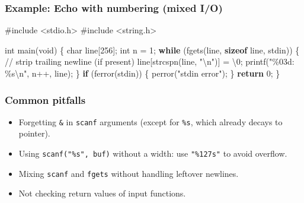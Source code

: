 \documentclass[
  letterpaper,
  DIV=11,
  numbers=noendperiod]{scrreprt}
\newenvironment{Shaded}{\begin{snugshade}}{\end{snugshade}}
\newcommand{\CharTok}[1]{\textcolor[rgb]{0.13,0.47,0.30}{#1}}
\newcommand{\CommentTok}[1]{\textcolor[rgb]{0.37,0.37,0.37}{#1}}
\newcommand{\ControlFlowTok}[1]{\textcolor[rgb]{0.00,0.23,0.31}{\textbf{#1}}}
\newcommand{\DataTypeTok}[1]{\textcolor[rgb]{0.68,0.00,0.00}{#1}}
\newcommand{\DecValTok}[1]{\textcolor[rgb]{0.68,0.00,0.00}{#1}}
\newcommand{\ImportTok}[1]{\textcolor[rgb]{0.00,0.46,0.62}{#1}}
\newcommand{\KeywordTok}[1]{\textcolor[rgb]{0.00,0.23,0.31}{\textbf{#1}}}
\newcommand{\NormalTok}[1]{\textcolor[rgb]{0.00,0.23,0.31}{#1}}
\newcommand{\OperatorTok}[1]{\textcolor[rgb]{0.37,0.37,0.37}{#1}}
\newcommand{\PreprocessorTok}[1]{\textcolor[rgb]{0.68,0.00,0.00}{#1}}
\newcommand{\SpecialCharTok}[1]{\textcolor[rgb]{0.37,0.37,0.37}{#1}}
\newcommand{\StringTok}[1]{\textcolor[rgb]{0.13,0.47,0.30}{#1}}
\providecommand{\tightlist}{%
  \setlength{\itemsep}{0pt}\setlength{\parskip}{0pt}}
\begin{document}
\subsubsection{Example: Echo with numbering (mixed
I/O)}\label{example-echo-with-numbering-mixed-io}

\begin{Shaded}
\begin{Highlighting}[]
\PreprocessorTok{\#include }\ImportTok{\textless{}stdio.h\textgreater{}}
\PreprocessorTok{\#include }\ImportTok{\textless{}string.h\textgreater{}}

\DataTypeTok{int}\NormalTok{ main}\OperatorTok{(}\DataTypeTok{void}\OperatorTok{)} \OperatorTok{\{}
    \DataTypeTok{char}\NormalTok{ line}\OperatorTok{[}\DecValTok{256}\OperatorTok{];}
    \DataTypeTok{int}\NormalTok{ n }\OperatorTok{=} \DecValTok{1}\OperatorTok{;}
    \ControlFlowTok{while} \OperatorTok{(}\NormalTok{fgets}\OperatorTok{(}\NormalTok{line}\OperatorTok{,} \KeywordTok{sizeof}\NormalTok{ line}\OperatorTok{,}\NormalTok{ stdin}\OperatorTok{))} \OperatorTok{\{}
        \CommentTok{// strip trailing newline (if present)}
\NormalTok{        line}\OperatorTok{[}\NormalTok{strcspn}\OperatorTok{(}\NormalTok{line}\OperatorTok{,} \StringTok{"}\SpecialCharTok{\textbackslash{}n}\StringTok{"}\OperatorTok{)]} \OperatorTok{=} \CharTok{\textquotesingle{}}\SpecialCharTok{\textbackslash{}0}\CharTok{\textquotesingle{}}\OperatorTok{;}
\NormalTok{        printf}\OperatorTok{(}\StringTok{"}\SpecialCharTok{\%03d}\StringTok{: }\SpecialCharTok{\%s\textbackslash{}n}\StringTok{"}\OperatorTok{,}\NormalTok{ n}\OperatorTok{++,}\NormalTok{ line}\OperatorTok{);}
    \OperatorTok{\}}
    \ControlFlowTok{if} \OperatorTok{(}\NormalTok{ferror}\OperatorTok{(}\NormalTok{stdin}\OperatorTok{))} \OperatorTok{\{}\NormalTok{ perror}\OperatorTok{(}\StringTok{"stdin error"}\OperatorTok{);} \OperatorTok{\}}
    \ControlFlowTok{return} \DecValTok{0}\OperatorTok{;}
\OperatorTok{\}}
\end{Highlighting}
\end{Shaded}

\subsubsection{Common pitfalls}\label{common-pitfalls-1}

\begin{itemize}
\tightlist
\item
  Forgetting \texttt{\&} in \texttt{scanf} arguments (except for
  \texttt{\%s}, which already decays to pointer).
\item
  Using \texttt{scanf("\%s",\ buf)} without a width: use
  \texttt{"\%127s"} to avoid overflow.
\item
  Mixing \texttt{scanf} and \texttt{fgets} without handling leftover
  newlines.
\item
  Not checking return values of input functions.
\end{itemize}
\end{document}
